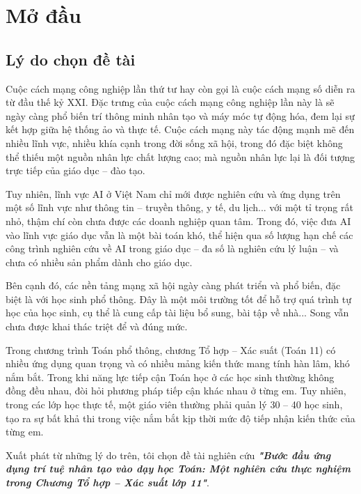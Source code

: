 \chapter*{Mở đầu}

\renewcommand*{\thesection}{\arabic{section}}
\renewcommand*{\thesubsection}{\alph{subsection}}

\section{Lý do chọn đề tài}
Cuộc cách mạng công nghiệp lần thứ tư hay còn gọi là cuộc cách mạng số diễn ra từ đầu thế kỷ XXI. Đặc trưng của cuộc cách mạng công nghiệp lần này là sẽ ngày càng phổ biến trí thông minh nhân tạo và máy móc tự động hóa, đem lại sự kết hợp giữa hệ thống ảo và thực tế. Cuộc cách mạng này tác động mạnh mẽ đến nhiều lĩnh vực, nhiều khía cạnh trong đời sống xã hội, trong đó đặc biệt không thể thiếu một nguồn nhân lực chất lượng cao; mà nguồn nhân lực lại là đối tượng trực tiếp của giáo dục – đào tạo.\par
Tuy nhiên, lĩnh vực AI ở Việt Nam chỉ mới được nghiên cứu và ứng dụng trên một số lĩnh vực như thông tin – truyền thông, y tế, du lịch... với một tỉ trọng rất nhỏ, thậm chí còn chưa được các doanh nghiệp quan tâm. Trong đó, việc đưa AI vào lĩnh vực giáo dục vẫn là một bài toán khó, thể hiện qua số lượng hạn chế các công trình nghiên cứu về AI trong giáo dục – đa số là nghiên cứu lý luận – và chưa có nhiều sản phẩm dành cho giáo dục.\par
Bên cạnh đó, các nền tảng mạng xã hội ngày càng phát triển và phổ biến, đặc biệt là với học sinh phổ thông. Đây là một môi trường tốt để hỗ trợ quá trình tự học của học sinh, cụ thể là cung cấp tài liệu bổ sung, bài tập về nhà... Song vẫn chưa được khai thác triệt để và đúng mức.\par
Trong chương trình Toán phổ thông, chương Tổ hợp – Xác suất (Toán 11) có nhiều ứng dụng quan trọng và có nhiều mảng kiến thức mang tính hàn lâm, khó nắm bắt. Trong khi năng lực tiếp cận Toán học ở các học sinh thường không đồng đều nhau, đòi hỏi phương pháp tiếp cận khác nhau ở từng em. Tuy nhiên, trong các lớp học thực tế, một giáo viên thường phải quản lý 30 – 40 học sinh, tạo ra sự bất khả thi trong việc nắm bắt kịp thời mức độ tiếp nhận kiến thức của từng em.\par
Xuất phát từ những lý do trên, tôi chọn đề tài nghiên cứu \textbf{\textit{"Bước đầu ứng dụng trí tuệ nhân tạo vào dạy học Toán: Một nghiên cứu thực nghiệm trong Chương Tổ hợp – Xác suất lớp 11"}}.\par


